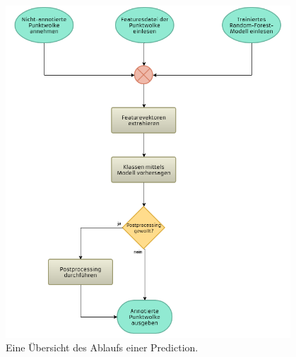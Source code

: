 \begin{figure}[!ht]
    \centering
    \includegraphics[width=0.95\textwidth]{graphics/flowchart_prediction}
    \caption{Eine Übersicht des Ablaufs einer Prediction.}
    \label{fig:prediction}
\end{figure}
